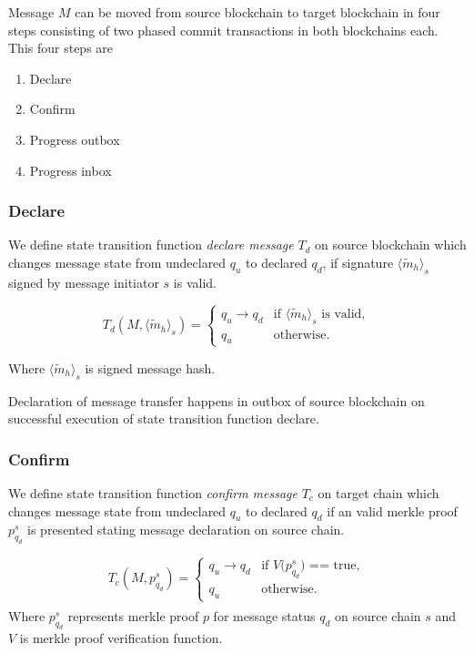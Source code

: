 \documentclass[12pt,a4paper]{article}
\begin{document}
Message $M$ can be moved from source blockchain to target blockchain in four steps consisting of two phased commit transactions in both blockchains each. 
This four steps are
\begin{enumerate}
\item Declare
\item Confirm
\item Progress outbox
\item Progress inbox
\end{enumerate}

\subsubsection{Declare}\label{gateway:declare}

We define state transition function \emph{declare message} $T_d$ on source blockchain which changes message state from undeclared $q_u$ to declared $q_d$, if signature $\langle \tilde{m}_h \rangle_s$ signed by message initiator $s$ is valid.

\begin{equation*}
T_d(M,\langle \tilde{m}_h \rangle_s)=\begin{cases}
q_u \rightarrow q_d & \text{if $\langle \tilde{m}_h \rangle_s$ is valid},\\
q_u& \text{otherwise}.
\end{cases}
\end{equation*}

Where $\langle \tilde{m}_h \rangle_s$ is signed message hash.

Declaration of message transfer happens in outbox of source blockchain on successful execution of state transition function declare.

\subsubsection{Confirm}\label{gateway:confirm}

We define state transition function \emph{confirm message} $T_c$ on target chain which changes message state from undeclared $q_u$ to declared $q_d$ if an valid merkle proof $p^s_{q_d}$ is presented stating message declaration on source chain.

\begin{equation*}
T_c(M,p^s_{q_d})=\begin{cases}
q_u \rightarrow q_d & \text{if $V$($p^s_{q_d}$) == true},\\
q_u& \text{otherwise}.
\end{cases}
\end{equation*}
\begin{align*}
\end{align*}
Where $p^s_{q_d}$ represents merkle proof $p$ for message status $q_d$ on source chain $s$ and $V$ is merkle proof verification function.
\end{document}
